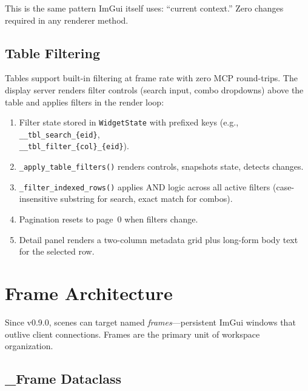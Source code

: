 \documentclass[a4paper,10pt]{article}
\begin{document}
This is the same pattern ImGui itself uses: ``current context.''
Zero changes required in any renderer method.

\subsection{Table Filtering}

Tables support built-in filtering at frame rate with zero MCP
round-trips.  The display server renders filter controls (search
input, combo dropdowns) above the table and applies filters in the
render loop:

\begin{enumerate}
  \item Filter state stored in \texttt{WidgetState} with prefixed
    keys (e.g., \texttt{\_\_tbl\_search\_\{eid\}},\\
    \texttt{\_\_tbl\_filter\_\{col\}\_\{eid\}}).
  \item \texttt{\_apply\_table\_filters()} renders controls, snapshots
    state, detects changes.
  \item \texttt{\_filter\_indexed\_rows()} applies AND logic across
    all active filters (case-insensitive substring for search,
    exact match for combos).
  \item Pagination resets to page~0 when filters change.
  \item Detail panel renders a two-column metadata grid plus
    long-form body text for the selected row.
\end{enumerate}

\section{Frame Architecture}\label{sec:frames}

Since v0.9.0, scenes can target named \emph{frames}---persistent ImGui
windows that outlive client connections.  Frames are the primary unit
of workspace organization.

\subsection{\_Frame Dataclass}
\end{document}
